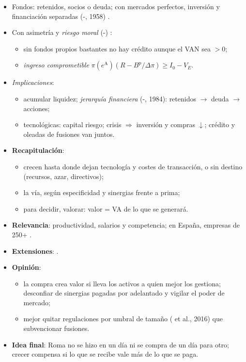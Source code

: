 \documentclass{article}
\begin{document}
\begin{columnas}
\begin{itemize}
\item Fondos: retenidos, socios o deuda; con mercados perfectos, inversión y financiación separadas (-, 1958) .
\item Con asimetría y \emph{riesgo moral} (-) :
  \begin{itemize}
  \item sin fondos propios bastantes no hay crédito aunque el VAN sea $>0$;
  \item \emph{ingreso comprometible} $\pi(e^{\mathrm A})(R-B^{\mathrm p}/\Delta\pi)\geq I_0-V_E$.
  \end{itemize}
\item \emph{Implicaciones}:
  \begin{itemize}
  \item acumular liquidez; \emph{jerarquía financiera} (-, 1984): retenidos $\to$ deuda $\to$ acciones;
  \item tecnológicas: capital riesgo; crisis $\Rightarrow$ inversión y compras $\downarrow$; crédito y oleadas de fusiones van juntos.
  \end{itemize}
\end{itemize}

\begin{itemize}
\item \textbf{Recapitulación}:
  \begin{itemize}
  \item crecen hasta donde dejan tecnología y costes de transacción, o sin destino (recursos, azar, directivos);
  \item la vía, según especificidad y sinergias frente a prima;
  \item para decidir, valorar: valor = VA de lo que se generará.
  \end{itemize}
\item \textbf{Relevancia}: productividad, salarios y competencia; en España, empresas de 250+ .
\item \textbf{Extensiones}:        .
\item \textbf{Opinión}:
  \begin{itemize}
  \item la compra crea valor si lleva los activos a quien mejor los gestiona; desconfiar de sinergias pagadas por adelantado y vigilar el poder de mercado;
  \item mejor quitar regulaciones por umbral de tamaño ( et al., 2016) que subvencionar fusiones.
  \end{itemize}
\item \textbf{Idea final}: Roma no se hizo en un día ni se compra de un día para otro; crecer compensa si lo que se recibe vale más de lo que se paga.
\end{itemize}


\end{columnas}
\end{document}
